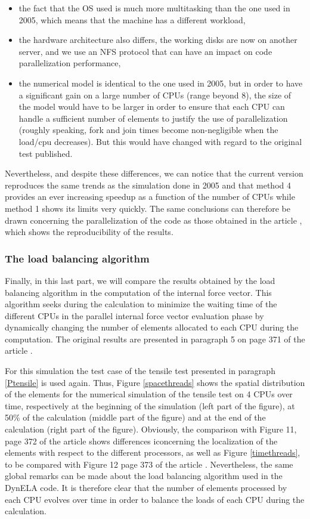 \documentclass{article}
\begin{document}
\begin{itemize}
\item the fact that the OS used is much more multitasking than the one used in 2005, which means that the machine has a different workload,
\item the hardware architecture also differs, the working disks are now on another server, and we use an NFS protocol that can have an impact on code parallelization performance,
\item the numerical model is identical to the one used in 2005, but in order to have a significant gain on a large number of CPUs (range beyond 8), the size of the model would have to be larger in order to ensure that each CPU can handle a sufficient number of elements to justify the use of parallelization (roughly speaking, fork and join times become non-negligible when the load/cpu decreases). But this would have changed with regard to the original test published.
\end{itemize}
Nevertheless, and despite these differences, we can notice that the current version reproduces the same trends as the simulation done in 2005 and that method 4 provides an ever increasing speedup as a function of the number of CPUs while method 1 shows its limits very quickly. The same conclusions can therefore be drawn concerning the parallelization of the code as those obtained in the article \cite{Pantale:2005}, which shows the reproducibility of the results.

\subsubsection{The load balancing algorithm}

Finally, in this last part, we will compare the results obtained by the load balancing algorithm in the computation of the internal force vector. This algorithm seeks during the calculation to minimize the waiting time of the different CPUs in the parallel internal force vector evaluation phase by dynamically changing the number of elements allocated to each CPU during the computation. The original results are presented in paragraph 5 on page 371 of the article \cite{Pantale:2005}.

For this simulation the test case of the tensile test presented in paragraph \ref{Ptensile} is used again. Thus, Figure \ref{spacethreads} shows the spatial distribution of the elements for the numerical simulation of the tensile test on 4 CPUs over time, respectively at the beginning of the simulation (left part of the figure), at 50\% of the calculation (middle part of the figure) and at the end of the calculation (right part of the figure). Obviously, the comparison with Figure 11, page 372 of the article \cite{Pantale:2005} shows differences iconcerning the localization of the elements with respect to the different processors, as well as Figure \ref{timethreads}, to be compared with Figure 12 page 373 of the article \cite{Pantale:2005}. Nevertheless, the same global remarks can be made about the load balancing algorithm used in the DynELA code. It is therefore clear that the number of elements processed by each CPU evolves over time in order to balance the loads of each CPU during the calculation.
\end{document}
